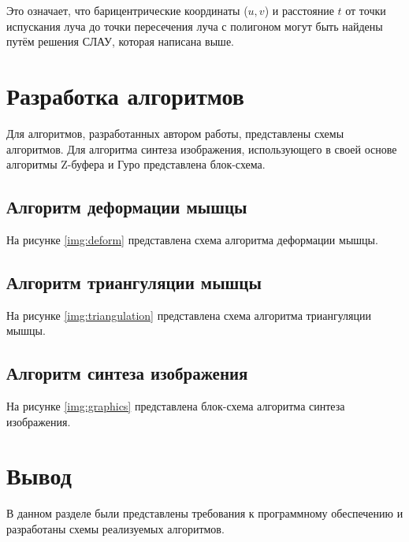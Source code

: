 Это означает, что барицентрические координаты ($u,v$) и расстояние $t$ от точки испускания луча до точки пересечения луча с полигоном могут быть найдены путём решения СЛАУ, которая написана выше.


\section{Разработка алгоритмов}

Для алгоритмов, разработанных автором работы, представлены схемы алгоритмов. Для алгоритма синтеза изображения, использующего в своей основе алгоритмы Z-буфера\cite{zbuf} и Гуро\cite{lmodels} представлена блок-схема.

\subsection{Алгоритм деформации мышцы}

На рисунке \ref{img:deform} представлена схема алгоритма деформации мышцы.


\clearpage
\subsection{Алгоритм триангуляции мышцы}


На рисунке \ref{img:triangulation} представлена схема алгоритма триангуляции мышцы.


\clearpage
\subsection{Алгоритм синтеза изображения}

На рисунке \ref{img:graphics} представлена блок-схема алгоритма синтеза изображения.


\section*{Вывод}

В данном разделе были представлены требования к программному обеспечению и разработаны схемы реализуемых алгоритмов.
